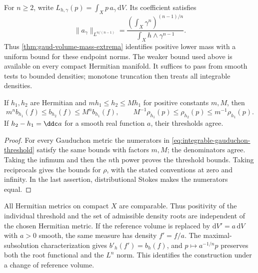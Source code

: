 For $n\geq2$, write $L_{h,\gamma}(p)=\int_Xp\,a_\gamma\,\mathrm{d}V$. Its coefficient satisfies
\[
 \|a_\gamma\|_{L^{n/(n-1)}}
 =\frac{(\int_X\gamma^n)^{(n-1)/n}}
        {\int_Xh\wedge\gamma^{n-1}}.
\]
Thus \cref{thm:gaud-volume-mass-extrema} identifies positive lower mass with a uniform bound for these endpoint norms. The weaker bound used above is available on every compact Hermitian manifold. It suffices to pass from smooth tests to bounded densities; monotone truncation then treats all integrable densities.

\begin{proposition}\label{prop:individual-threshold-backgrounds}
If $h_1,h_2$ are Hermitian and $m h_1\leq h_2\leq M h_1$ for positive constants $m,M$, then
\[
 m^n b_{h_1}(f)\leq b_{h_2}(f)\leq M^n b_{h_1}(f),
 \qquad
 M^{-1}\rho_{h_1}(p)\leq\rho_{h_2}(p)\leq m^{-1}\rho_{h_1}(p).
\]
If $h_2-h_1=\ddc a$ for a smooth real function $a$, their thresholds agree.
\end{proposition}
\begin{proof}
For every Gauduchon metric the numerators in \eqref{eq:integrable-gauduchon-threshold} satisfy the same bounds with factors $m,M$; the denominators agree. Taking the infimum and then the $n$th power proves the threshold bounds. Taking reciprocals gives the bounds for $\rho$, with the stated conventions at zero and infinity. In the last assertion, distributional Stokes makes the numerators equal.
\end{proof}

All Hermitian metrics on compact $X$ are comparable. Thus positivity of the individual threshold and the set of admissible density roots are independent of the chosen Hermitian metric. If the reference volume is replaced by $\mathrm{d}V'=a\,\mathrm{d}V$ with $a>0$ smooth, the same measure has density $f'=f/a$. The maximal-subsolution characterization gives $b'_h(f')=b_h(f)$, and $p\mapsto a^{-1/n}p$ preserves both the root functional and the $L^n$ norm. This identifies the construction under a change of reference volume.
